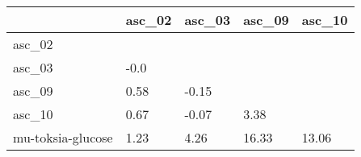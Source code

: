 \begin{tabular}{lllll}
\toprule
{} & asc\_02 & asc\_03 & asc\_09 & asc\_10 \\
\midrule
asc\_02            &        &        &        &        \\
asc\_03            &   -0.0 &        &        &        \\
asc\_09            &   0.58 &  -0.15 &        &        \\
asc\_10            &   0.67 &  -0.07 &   3.38 &        \\
mu-toksia-glucose &   1.23 &   4.26 &  16.33 &  13.06 \\
\bottomrule
\end{tabular}

